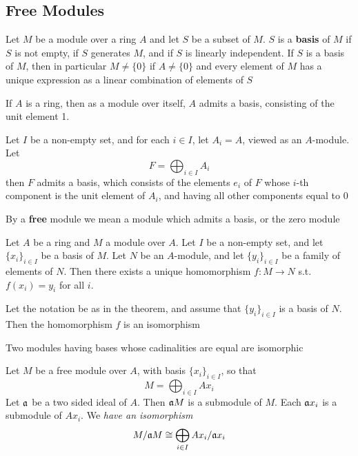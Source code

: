 \documentclass[11pt]{article}
\begin{document}
\subsection{Free Modules}
\label{sec:org2d8b393}
Let \(M\) be a module over a ring \(A\) and let \(S\) be a subset of \(M\). \(S\) is a \textbf{basis}
of \(M\) if \(S\) is not empty, if \(S\) generates \(M\), and if \(S\) is linearly independent.
If \(S\) is a basis of \(M\), then in particular \(M\neq\{0\}\) if \(A\neq\{0\}\) and every element
of \(M\) has a unique expression as a linear combination of elements of \(S\)

If \(A\) is a ring, then as a module over itself, \(A\) admits a basis, consisting of the unit
element 1.

Let \(I\) be a non-empty set, and for each \(i\in I\), let \(A_i=A\), viewed as an \(A\)-module. Let
\begin{equation*}
F=\bigoplus_{i\in I}A_i
\end{equation*}
then \(F\) admits a basis, which consists of the elements \(e_i\) of \(F\) whose \(i\)-th
component is the unit element of \(A_i\), and having all other components equal to 0

By a \textbf{free} module we mean a module which admits a basis, or the zero module

\begin{theorem}[]
Let \(A\) be a ring and \(M\) a module over \(A\). Let \(I\) be a non-empty set, and
let \(\{x_i\}_{i\in I}\) be a basis of \(M\). Let \(N\) be an \(A\)-module, and let \(\{y_i\}_{i\in I}\) be
a family of elements of \(N\). Then there exists a unique homomorphism \(f:M\to N\)
s.t. \(f(x_i)=y_i\) for all \(i\).
\end{theorem}

\begin{corollary}[]
Let the notation be as in the theorem, and assume that \(\{y_i\}_{i\in I}\) is a basis of \(N\). Then
the homomorphism \(f\) is an isomorphism
\end{corollary}

\begin{corollary}[]
Two modules having bases whose cadinalities are equal are isomorphic
\end{corollary}

Let \(M\) be a free module over \(A\), with basis \(\{x_i\}_{i\in I}\), so that
\begin{equation*}
M=\bigoplus_{i\in I}Ax_i
\end{equation*}
Let \(\mathfrak{a}\) be a two sided ideal of \(A\). Then \(\mathfrak{a} M\) is a submodule of \(M\). Each \(\mathfrak{a} x_i\) is a
submodule of \(Ax_i\). We \emph{have an isomorphism}
   \begin{equation*}
M/\mathfrak{a} M\cong\bigoplus_{i\in I}Ax_i/\mathfrak{a} x_i
   \end{equation*}
\end{document}
